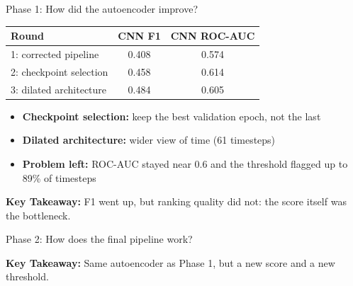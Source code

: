 \documentclass{beamer}
\newcommand{\takeaway}[1]{\par\vspace{0.4em}\noindent\textbf{Key Takeaway:} #1}
\begin{document}
\begin{frame}{Phase 1: How did the autoencoder improve?}
\begin{center}
\small
\begin{tabular}{|l|c|c|}
\hline
\textbf{Round} & \textbf{CNN F1} & \textbf{CNN ROC-AUC} \\
\hline
1: corrected pipeline & 0.408 & 0.574 \\
2: checkpoint selection & 0.458 & 0.614 \\
3: dilated architecture & 0.484 & 0.605 \\
\hline
\end{tabular}
\end{center}
\begin{itemize}
  \item \textbf{Checkpoint selection:} keep the best validation epoch, not the last
  \item \textbf{Dilated architecture:} wider view of time (61 timesteps)
  \item \textbf{Problem left:} ROC-AUC stayed near 0.6 and the threshold flagged up to 89\% of timesteps
\end{itemize}
\takeaway{F1 went up, but ranking quality did not: the score itself was the bottleneck.}
\end{frame}

\begin{frame}{Phase 2: How does the final pipeline work?}
\begin{center}
\end{center}
\takeaway{Same autoencoder as Phase 1, but a new score and a new threshold.}
\end{frame}
\end{document}
